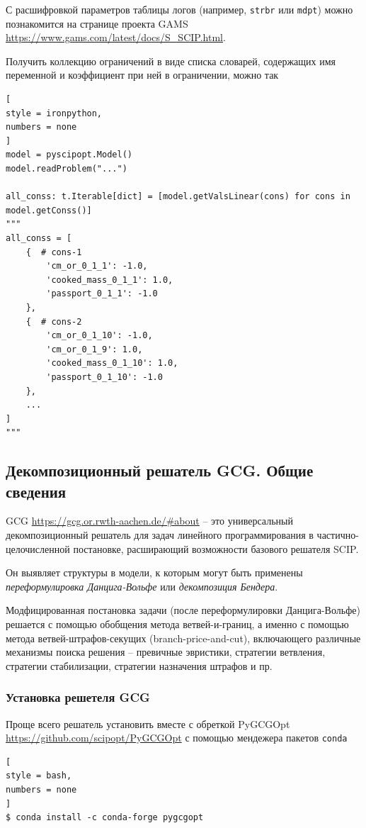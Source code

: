 \documentclass[%
	11pt,
	a4paper,
	utf8,
		]{article}
\begin{document}
С расшифровкой параметров таблицы логов (например, \verb|strbr| или \verb|mdpt|) можно познакомится на странице проекта GAMS \url{https://www.gams.com/latest/docs/S_SCIP.html}.

Получить коллекцию ограничений в виде списка словарей, содержащих имя переменной и коэффициент при ней в ограничении, можно так
\begin{lstlisting}[
style = ironpython,
numbers = none
]
model = pyscipopt.Model()
model.readProblem("...")

all_conss: t.Iterable[dict] = [model.getValsLinear(cons) for cons in model.getConss()]
"""
all_conss = [
    {  # cons-1
    	'cm_or_0_1_1': -1.0,
    	'cooked_mass_0_1_1': 1.0,
    	'passport_0_1_1': -1.0
    },
    {  # cons-2
    	'cm_or_0_1_10': -1.0,
    	'cm_or_0_1_9': 1.0,
    	'cooked_mass_0_1_10': 1.0,
    	'passport_0_1_10': -1.0
    },
    ...
]
"""
\end{lstlisting}



\subsection{Декомпозиционный решатель GCG. Общие сведения}

GCG \url{https://gcg.or.rwth-aachen.de/#about} -- это универсальный декомпозиционный решатель для задач линейного программирования в частично-целочисленной постановке, расширающий возможности базового решателя SCIP.

Он выявляет структуры в модели, к которым могут быть применены \emph{переформулировка Данцига-Вольфе} или \emph{декомпозиция Бендера}.

Модфицированная постановка задачи (после переформулировки Данцига-Вольфе) решается с помощью обобщения метода ветвей-и-границ, а именно с помощью метода ветвей-штрафов-секущих (branch-price-and-cut), включающего различные механизмы поиска решения -- превичные эвристики, стратегии ветвления, стратегии стабилизации, стратегии назначения штрафов и пр.

\subsubsection{Установка решетеля GCG}

Проще всего решатель установить вместе с обреткой PyGCGOpt \url{https://github.com/scipopt/PyGCGOpt} с помощью мендежера пакетов \texttt{conda}
\begin{lstlisting}[
style = bash,
numbers = none
]
$ conda install -c conda-forge pygcgopt
\end{lstlisting}
\end{document}
